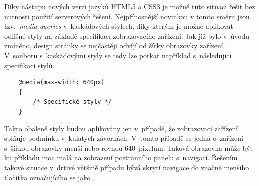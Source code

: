 Díky nástupu nových verzí jazyků HTML5 a CSS3 je možné tuto situaci řešit bez nutnosti použití serverových řešení. Nejpřínosnější novinkou v tomto směru jsou tzv.~\emph{media queries} v~kaskádových stylech, díky kterým je možné aplikovat odlišné styly na základě specifikací zobrazovacího zařízení. Jak již bylo v~úvodu zmíněno, design stránky se nejčastěji odvíjí od šířky obrazovky zařízení. V~souboru s~kaskádovými styly se tedy lze potkat například s~následující specifikací stylů.

\begin{verbatim}
    @media(max-width: 640px)
    {
        /* Specifické styly */
    }
\end{verbatim}

Takto obalené styly budou aplikovány jen v~případě, že zobrazovací zařízení splňuje podmínku v~kulatých závorkách. V~tomto případě se jedná o~zařízení s~šířkou obrazovky menší nebo rovnou 640~pixelům. Taková obrazovka může být ku příkladu moc malá na zobrazení postranního panelu s~navigací. Řešením takové situace v~drtivé většině případu bývá skrytí navigace do značně menšího tlačítka označujícího se jako .

